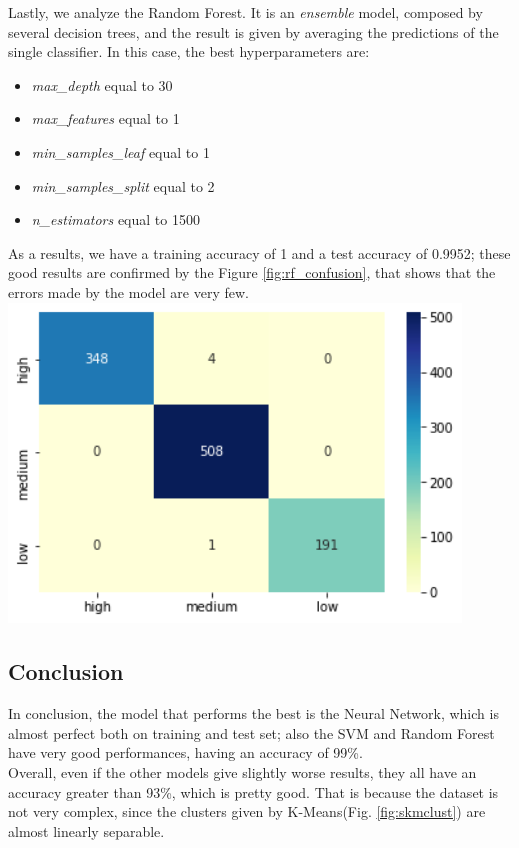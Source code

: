 Lastly, we analyze the Random Forest. It is an \emph{ensemble} model, composed by several decision trees, and the result is given by averaging the predictions of the single classifier.
In this case, the best hyperparameters are:
\begin{itemize}
\item \emph{max\_depth} equal to 30
\item \emph{max\_features} equal to 1
\item \emph{min\_samples\_leaf} equal to 1
\item \emph{min\_samples\_split} equal to 2
\item \emph{n\_estimators} equal to 1500
\end{itemize}
As a results, we have a training accuracy of 1 and a test accuracy of 0.9952; these good results are confirmed by the Figure \ref{fig:rf_confusion}, that shows that the errors made by the model are very few.
\centering
\includegraphics[width=0.90\textwidth]{img/classification/rf_confusion.png}
\captionsetup{justification=centering}
\label{fig:rf_confusion}

\subsection{Conclusion}
In conclusion, the model that performs the best is the Neural Network, which is almost perfect both on training and test set; also the SVM and Random Forest have very good performances, having an accuracy of 99\%.\\
Overall, even if the other models give slightly worse results, they all have an accuracy greater than 93\%, which is pretty good. That is because the dataset is not very complex, since the clusters given by K-Means(Fig. \ref{fig:skmclust}) are almost linearly separable.


